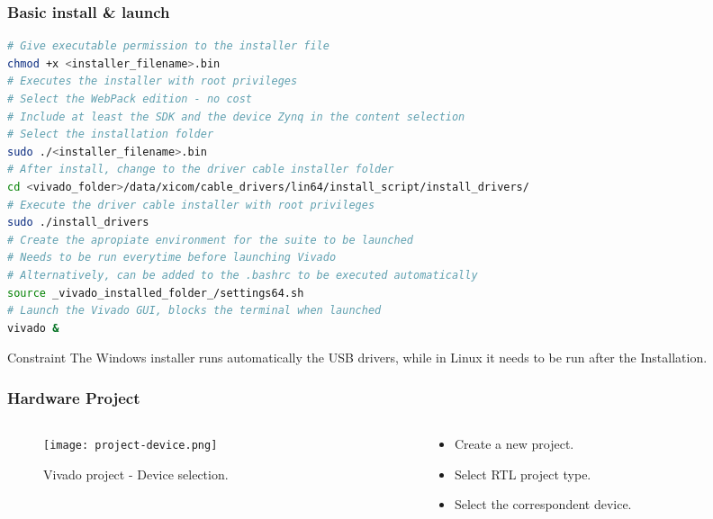\begin{frame}[fragile]
	\frametitle{Basic install \& launch}
	\begin{lstlisting}[language=bash, basicstyle=\tiny\ttfamily, tabsize=2, commentstyle=\color{darkgray}, keywordstyle=\color{blue}, backgroundcolor=\color{lightgray}, morekeywords={chmod, sudo}, breaklines=true]
# Give executable permission to the installer file
chmod +x <installer_filename>.bin
# Executes the installer with root privileges
# Select the WebPack edition - no cost
# Include at least the SDK and the device Zynq in the content selection
# Select the installation folder
sudo ./<installer_filename>.bin
# After install, change to the driver cable installer folder
cd <vivado_folder>/data/xicom/cable_drivers/lin64/install_script/install_drivers/
# Execute the driver cable installer with root privileges
sudo ./install_drivers
# Create the apropiate environment for the suite to be launched
# Needs to be run everytime before launching Vivado
# Alternatively, can be added to the .bashrc to be executed automatically
source _vivado_installed_folder_/settings64.sh
# Launch the Vivado GUI, blocks the terminal when launched
vivado &
	\end{lstlisting} \pause
	\begin{alertblock}{Constraint}
		{\small The Windows installer runs automatically the USB drivers, while in Linux it needs to be run after the Installation.}
	\end{alertblock}
\end{frame}

\begin{frame}
	\frametitle{Hardware Project}
	\begin{columns}
		\begin{column}{0.5\textwidth}
			\begin{figure}
				\texttt{[image: project-device.png]}
				\caption{Vivado project - Device selection.}\label{fig:project-device}
			\end{figure}
		\end{column}
		\begin{column}{0.5\textwidth}
			\begin{itemize}
				\item Create a new project.
				\item Select RTL project type.
				\item Select the correspondent device.
			\end{itemize}
		\end{column}
	\end{columns}
\end{frame}

